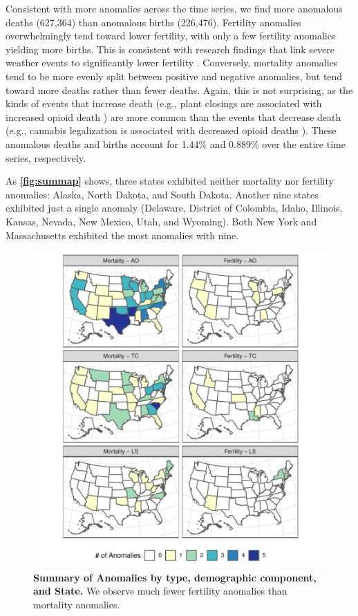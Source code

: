 \documentclass[12pt]{article}
\begin{document}
Consistent with more anomalies across the time series, we find more
anomalous deaths (627,364) than anomalous births (226,476). Fertility
anomalies overwhelmingly tend toward lower fertility, with only a few
fertility anomalies yielding more births. This is consistent with
research findings that link severe weather events to significantly lower
fertility \citep{Evans2008Hurricanebirth}. Conversely, mortality
anomalies tend to be more evenly split between positive and negative
anomalies, but tend toward more deaths rather than fewer deaths. Again,
this is not surprising, as the kinds of events that increase death
(e.g., plant closings are associated with increased opioid death
\citep{Venkataramani2019}) are more common than the events that decrease
death (e.g., cannabis legalization is associated with decreased opioid
deaths \citep{Livingston2017Cannabis}). These anomalous deaths and
births account for 1.44\% and 0.889\% over the entire time series,
respectively.

As \textbf{\autoref{fig:summap}} shows, three states exhibited neither
mortality nor fertility anomalies: Alaska, North Dakota, and South
Dakota. Another nine states exhibited just a single anomaly (Delaware,
District of Colombia, Idaho, Illinois, Kansas, Nevada, New Mexico, Utah,
and Wyoming). Both New York and Massachusetts exhibited the most
anomalies with nine.

\begin{figure}
\centering
\includegraphics{MainDocument_files/figure-latex/AnomalyMap-1.pdf}
\caption{\textbf{Summary of Anomalies by type, demographic component, and State.}
We observe much fewer fertility anomalies than mortality anomalies.
\label{fig:summap}}
\end{figure}
\end{document}

